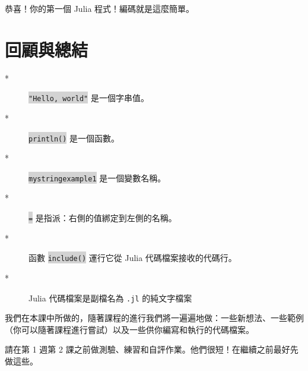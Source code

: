 \documentclass[]{article}
\begin{document}
恭喜！你的第一個 Julia 程式！編碼就是這麼簡單。

\section*{回顧與總結}

\begin{description}
	\item[*] \colorbox{lightgray}{\tt "Hello, world"} 是一個字串值。
	\item[*] \colorbox{lightgray}{\tt println()} 是一個函數。
	\item[*] \colorbox{lightgray}{\tt mystringexample1} 是一個變數名稱。
	\item[*] \colorbox{lightgray}{\tt =} 是指派：右側的值綁定到左側的名稱。
	\item[*] 函數 \colorbox{lightgray}{\tt include()} 運行它從 Julia 代碼檔案接收的代碼行。
	\item[*] Julia 代碼檔案是副檔名為 {\tt .jl} 的純文字檔案
\end{description}

我們在本課中所做的，隨著課程的進行我們將一遍遍地做：一些新想法、一些範例（你可以隨著課程進行嘗試）以及一些供你編寫和執行的代碼檔案。

請在第 1 週第 2 課之前做測驗、練習和自評作業。他們很短！在繼續之前最好先做這些。
\end{document}
